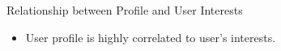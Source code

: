 \documentclass{beamer}
\begin{document}
\begin{frame}
\begin{columns}[T]
\begin{column}{.46\textwidth}
{\begin{block}{Relationship between Profile and User Interests }
\begin{itemize}
        \item User profile is highly correlated to user's interests.
\end{itemize}
\begin{figure}[H]
        \centering
        \label{fig:profile} %
\end{figure}

\end{block}}
\end{column}
\end{columns}
\end{frame}
\end{document}
